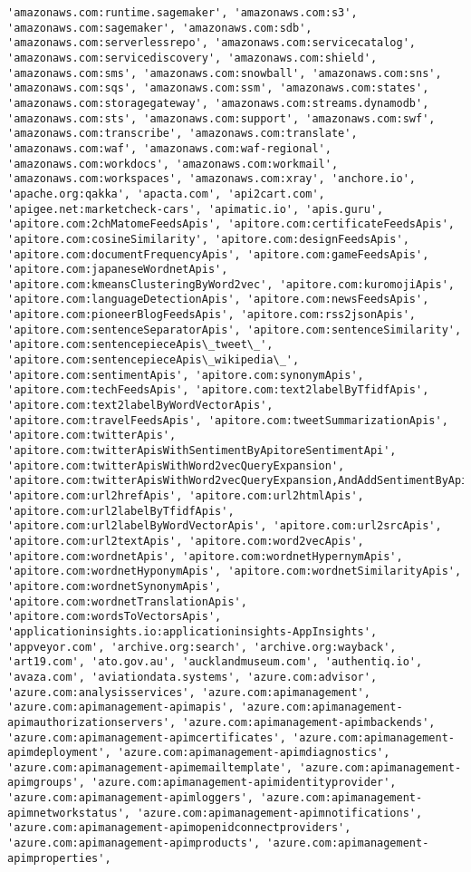 \documentclass[11pt]{article}
\begin{document}
\begin{Verbatim}[commandchars=\\\{\}]
'amazonaws.com:runtime.sagemaker', 'amazonaws.com:s3', 'amazonaws.com:sagemaker', 'amazonaws.com:sdb', 'amazonaws.com:serverlessrepo', 'amazonaws.com:servicecatalog', 'amazonaws.com:servicediscovery', 'amazonaws.com:shield', 'amazonaws.com:sms', 'amazonaws.com:snowball', 'amazonaws.com:sns', 'amazonaws.com:sqs', 'amazonaws.com:ssm', 'amazonaws.com:states', 'amazonaws.com:storagegateway', 'amazonaws.com:streams.dynamodb', 'amazonaws.com:sts', 'amazonaws.com:support', 'amazonaws.com:swf', 'amazonaws.com:transcribe', 'amazonaws.com:translate', 'amazonaws.com:waf', 'amazonaws.com:waf-regional', 'amazonaws.com:workdocs', 'amazonaws.com:workmail', 'amazonaws.com:workspaces', 'amazonaws.com:xray', 'anchore.io', 'apache.org:qakka', 'apacta.com', 'api2cart.com', 'apigee.net:marketcheck-cars', 'apimatic.io', 'apis.guru', 'apitore.com:2chMatomeFeedsApis', 'apitore.com:certificateFeedsApis', 'apitore.com:cosineSimilarity', 'apitore.com:designFeedsApis', 'apitore.com:documentFrequencyApis', 'apitore.com:gameFeedsApis', 'apitore.com:japaneseWordnetApis', 'apitore.com:kmeansClusteringByWord2vec', 'apitore.com:kuromojiApis', 'apitore.com:languageDetectionApis', 'apitore.com:newsFeedsApis', 'apitore.com:pioneerBlogFeedsApis', 'apitore.com:rss2jsonApis', 'apitore.com:sentenceSeparatorApis', 'apitore.com:sentenceSimilarity', 'apitore.com:sentencepieceApis\_tweet\_', 'apitore.com:sentencepieceApis\_wikipedia\_', 'apitore.com:sentimentApis', 'apitore.com:synonymApis', 'apitore.com:techFeedsApis', 'apitore.com:text2labelByTfidfApis', 'apitore.com:text2labelByWordVectorApis', 'apitore.com:travelFeedsApis', 'apitore.com:tweetSummarizationApis', 'apitore.com:twitterApis', 'apitore.com:twitterApisWithSentimentByApitoreSentimentApi', 'apitore.com:twitterApisWithWord2vecQueryExpansion', 'apitore.com:twitterApisWithWord2vecQueryExpansion,AndAddSentimentByApitoreSentimentApi', 'apitore.com:url2hrefApis', 'apitore.com:url2htmlApis', 'apitore.com:url2labelByTfidfApis', 'apitore.com:url2labelByWordVectorApis', 'apitore.com:url2srcApis', 'apitore.com:url2textApis', 'apitore.com:word2vecApis', 'apitore.com:wordnetApis', 'apitore.com:wordnetHypernymApis', 'apitore.com:wordnetHyponymApis', 'apitore.com:wordnetSimilarityApis', 'apitore.com:wordnetSynonymApis', 'apitore.com:wordnetTranslationApis', 'apitore.com:wordsToVectorsApis', 'applicationinsights.io:applicationinsights-AppInsights', 'appveyor.com', 'archive.org:search', 'archive.org:wayback', 'art19.com', 'ato.gov.au', 'aucklandmuseum.com', 'authentiq.io', 'avaza.com', 'aviationdata.systems', 'azure.com:advisor', 'azure.com:analysisservices', 'azure.com:apimanagement', 'azure.com:apimanagement-apimapis', 'azure.com:apimanagement-apimauthorizationservers', 'azure.com:apimanagement-apimbackends', 'azure.com:apimanagement-apimcertificates', 'azure.com:apimanagement-apimdeployment', 'azure.com:apimanagement-apimdiagnostics', 'azure.com:apimanagement-apimemailtemplate', 'azure.com:apimanagement-apimgroups', 'azure.com:apimanagement-apimidentityprovider', 'azure.com:apimanagement-apimloggers', 'azure.com:apimanagement-apimnetworkstatus', 'azure.com:apimanagement-apimnotifications', 'azure.com:apimanagement-apimopenidconnectproviders', 'azure.com:apimanagement-apimproducts', 'azure.com:apimanagement-apimproperties', 
\end{Verbatim}
\end{document}
